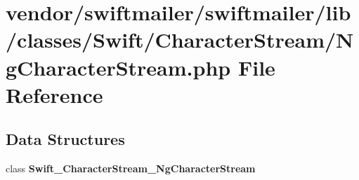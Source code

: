 \section{vendor/swiftmailer/swiftmailer/lib/classes/\+Swift/\+Character\+Stream/\+Ng\+Character\+Stream.php File Reference}
\label{_ng_character_stream_8php}
\subsection*{Data Structures}
\begin{DoxyCompactItemize}
\item 
class {\bf Swift\+\_\+\+Character\+Stream\+\_\+\+Ng\+Character\+Stream}
\end{DoxyCompactItemize}
